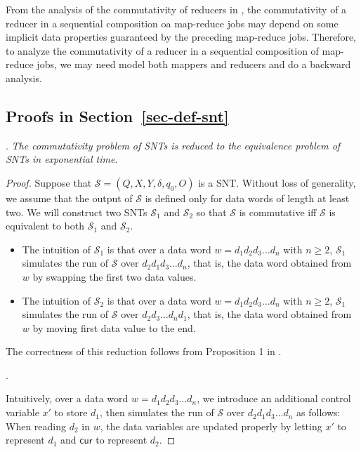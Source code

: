\documentclass[runningheads,a4paper]{llncs}
\def\Ss{{\mathcal{S} }}
\newcommand\cur{\mathsf{cur}}
\begin{document}
From the analysis of the commutativity of reducers in \cite{XZZ+14}, the commutativity of a reducer in a sequential composition oa map-reduce jobs may depend on some implicit data properties guaranteed by the preceding map-reduce jobs. Therefore, to analyze the commutativity of a reducer in a sequential composition of map-reduce jobs, we may need model both mappers and reducers and do a backward analysis.





\newpage

\begin{appendix}

\section{Proofs in Section~\ref{sec-def-snt}}

. 
\emph{The commutativity problem of SNTs is reduced to the equivalence problem of SNTs in exponential time}.

\begin{proof}
Suppose that $\Ss=(Q, X, Y, \delta, q_0, O)$ is a SNT. Without loss of generality, we assume that the output of $\Ss$ is defined only for data words of length at least two. We will construct two SNTs $\Ss_1$ and $\Ss_2$ so that $\Ss$ is commutative iff $\Ss$ is equivalent to both $\Ss_1$ and $\Ss_2$.
\begin{itemize}
\item The intuition of $\Ss_1$ is that over a data word $w=d_1 d_2 d_3 \dots d_n$ with $n\ge 2$, $\Ss_1$ simulates the run of $\Ss$ over $d_2 d_1 d_3 \dots d_n$, that is, the data word obtained from $w$ by swapping the first two data values.
%
\item The intuition of $\Ss_2$ is that over a data word $w=d_1 d_2 d_3 \dots d_n$ with $n\ge 2$, $\Ss_1$ simulates the run of $\Ss$ over $d_2 d_3 \dots d_n d_1$, that is, the data word obtained from $w$ by moving first data value to the end. 
\end{itemize}
The correctness of this reduction follows from Proposition 1 in \cite{CHSW15}.

\smallskip

\noindent {\it The construction of $\Ss_1$}.

Intuitively, over a data word $w=d_1d_2 d_3 \dots d_n$, we introduce an additional control variable $x'$ to store $d_1$, then simulates the run of $\Ss$ over $d_2 d_1 d_3 \dots d_n$ as follows: When reading $d_2$ in $w$, the data variables are updated properly by letting $x'$ to represent $d_1$ and $\cur$ to represent $d_2$.


\end{proof}
\end{appendix}
\end{document}
